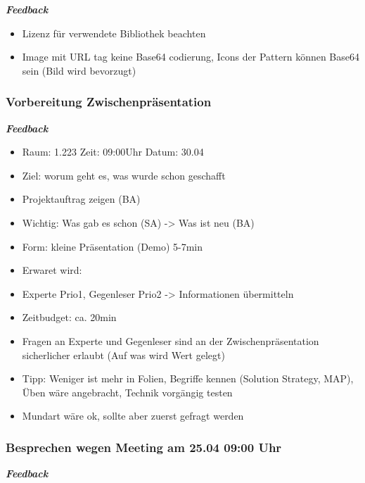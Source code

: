 \emph{\textbf{Feedback}}

\begin{itemize}

\item Lizenz für verwendete Bibliothek beachten
\item Image mit URL tag keine Base64 codierung, Icons der Pattern können Base64 sein (Bild wird bevorzugt)
\end{itemize}

\hypertarget{vorbereitung-zwischenpruxe4sentation}{%
\subsubsection*{Vorbereitung
Zwischenpräsentation}\label{vorbereitung-zwischenpruxe4sentation}}

\emph{\textbf{Feedback}}

\begin{itemize}
\item Raum: 1.223 Zeit: 09:00Uhr Datum: 30.04
\item Ziel: worum geht es, was wurde schon geschafft
\item Projektauftrag zeigen (BA)
\item Wichtig: Was gab es schon (SA) -\textgreater{} Was ist neu (BA)
\item Form: kleine Präsentation (Demo) 5-7min
\item Erwaret wird:
\item Experte Prio1, Gegenleser Prio2 -\textgreater{} Informationen übermitteln
\item Zeitbudget: ca. 20min
\item Fragen an Experte und Gegenleser sind an der Zwischenpräsentation sicherlicher erlaubt (Auf was wird Wert gelegt)
\item Tipp: Weniger ist mehr in Folien, Begriffe kennen (Solution Strategy, MAP), Üben wäre angebracht, Technik vorgängig testen
\item Mundart wäre ok, sollte aber zuerst gefragt werden
\end{itemize}

\hypertarget{besprechen-wegen-meeting-am-2504-0900-uhr}{%
\subsubsection*{Besprechen wegen Meeting am 25.04 09:00
Uhr}\label{besprechen-wegen-meeting-am-2504-0900-uhr}}

\emph{\textbf{Feedback}}

